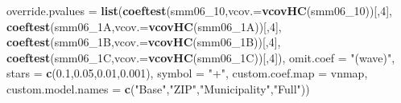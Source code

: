 \documentclass[
]{article}
\newenvironment{Shaded}{\begin{snugshade}}{\end{snugshade}}
\newcommand{\DataTypeTok}[1]{\textcolor[rgb]{0.13,0.29,0.53}{#1}}
\newcommand{\DecValTok}[1]{\textcolor[rgb]{0.00,0.00,0.81}{#1}}
\newcommand{\FloatTok}[1]{\textcolor[rgb]{0.00,0.00,0.81}{#1}}
\newcommand{\KeywordTok}[1]{\textcolor[rgb]{0.13,0.29,0.53}{\textbf{#1}}}
\newcommand{\NormalTok}[1]{#1}
\newcommand{\StringTok}[1]{\textcolor[rgb]{0.31,0.60,0.02}{#1}}
\begin{document}
\begin{Shaded}
\begin{Highlighting}[]
          \DataTypeTok{override.pvalues =} \KeywordTok{list}\NormalTok{(}\KeywordTok{coeftest}\NormalTok{(smm06_}\DecValTok{10}\NormalTok{,}\DataTypeTok{vcov.=}\KeywordTok{vcovHC}\NormalTok{(smm06_}\DecValTok{10}\NormalTok{))[,}\DecValTok{4}\NormalTok{],}
                                  \KeywordTok{coeftest}\NormalTok{(smm06_1A,}\DataTypeTok{vcov.=}\KeywordTok{vcovHC}\NormalTok{(smm06_1A))[,}\DecValTok{4}\NormalTok{],}
                                  \KeywordTok{coeftest}\NormalTok{(smm06_1B,}\DataTypeTok{vcov.=}\KeywordTok{vcovHC}\NormalTok{(smm06_1B))[,}\DecValTok{4}\NormalTok{],}
                                  \KeywordTok{coeftest}\NormalTok{(smm06_1C,}\DataTypeTok{vcov.=}\KeywordTok{vcovHC}\NormalTok{(smm06_1C))[,}\DecValTok{4}\NormalTok{]),}
          \DataTypeTok{omit.coef =} \StringTok{"(wave)"}\NormalTok{, }\DataTypeTok{stars =} \KeywordTok{c}\NormalTok{(}\FloatTok{0.1}\NormalTok{,}\FloatTok{0.05}\NormalTok{,}\FloatTok{0.01}\NormalTok{,}\FloatTok{0.001}\NormalTok{), }\DataTypeTok{symbol =} \StringTok{"+"}\NormalTok{,}
          \DataTypeTok{custom.coef.map =}\NormalTok{ vnmap, }
          \DataTypeTok{custom.model.names =} \KeywordTok{c}\NormalTok{(}\StringTok{"Base"}\NormalTok{,}\StringTok{"ZIP"}\NormalTok{,}\StringTok{"Municipality"}\NormalTok{,}\StringTok{"Full"}\NormalTok{))}
\end{Highlighting}
\end{Shaded}
\end{document}

